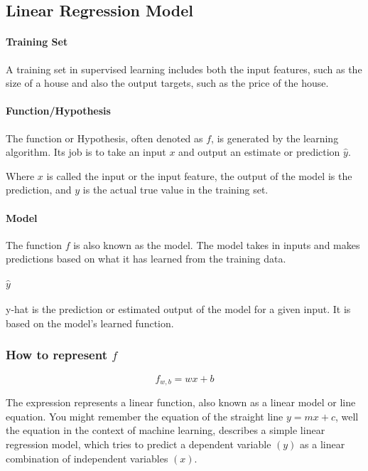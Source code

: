 \documentclass[a4paper]{article}
\begin{document}
    \subsection*{Linear Regression Model}

    \paragraph*{Training Set}
    A training set in supervised learning includes both the input features, such as the size of a house and also the output targets, such as the price of the house. 
    
    \paragraph*{Function/Hypothesis} The function or Hypothesis, often denoted as \(f\), is generated by the learning algorithm. Its job is to take an input \(x\) and output an estimate or prediction \(\hat{y}\).

    Where \(x\) is called the input or the input feature, the output of the model is the prediction, and \(y\) is the actual true value in the training set. 


    \paragraph*{Model} The function \(f\) is also known as the model. The model takes in inputs and makes predictions based on what it has learned from the training data. 

    \paragraph*{\(\hat{y}\)} y-hat is the prediction or estimated output of the model for a given input. It is based on the model's learned function. 

    \subsubsection*{How to represent \(f\)}

    \[f_{w,b} = wx + b\]

    The expression represents a linear function, also known as a linear model or line equation. You might remember the equation of the straight line \(y = mx + c\), well the equation in the context of machine learning, describes a simple linear regression model, which tries to predict a dependent variable \((y)\) as a linear combination of independent variables \((x)\).
\end{document}
